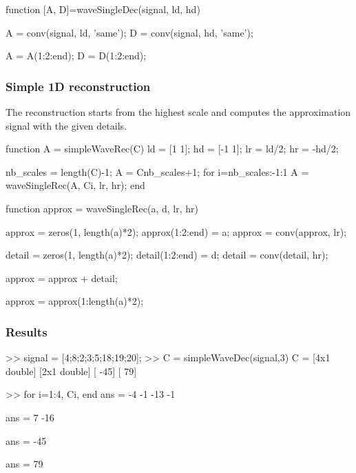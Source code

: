 \begin{matlab}
function [A, D]=waveSingleDec(signal, ld, hd)

A = conv(signal, ld, 'same');
D = conv(signal, hd, 'same');

A = A(1:2:end);
D = D(1:2:end);
\end{matlab}

\subsubsection{Simple 1D reconstruction}
The reconstruction starts from the highest scale and computes the approximation signal with the given details.
\begin{matlab}
function A = simpleWaveRec(C)
%
ld = [1 1];
hd = [-1 1];
lr = ld/2;
hr = -hd/2;

nb_scales = length(C)-1;
A = C{nb_scales+1};
for i=nb_scales:-1:1
    A = waveSingleRec(A, C{i}, lr, hr);
end
\end{matlab}

\begin{matlab}
function approx = waveSingleRec(a, d, lr, hr)
%

approx = zeros(1, length(a)*2);
approx(1:2:end) = a;
approx = conv(approx, lr);

detail = zeros(1, length(a)*2);
detail(1:2:end) = d;
detail = conv(detail, hr);

approx = approx + detail;

approx = approx(1:length(a)*2);
\end{matlab}

\subsubsection{Results}
\begin{mwindow}
>> signal = [4;8;2;3;5;18;19;20];
>> C = simpleWaveDec(signal,3)
C = 
    [4x1 double]
    [2x1 double]
    [       -45]
    [        79]
    
>> for i=1:4, C{i}, end
ans =
    -4
    -1
   -13
    -1

ans =
     7
   -16

ans =
   -45

ans =
    79
\end{mwindow}


